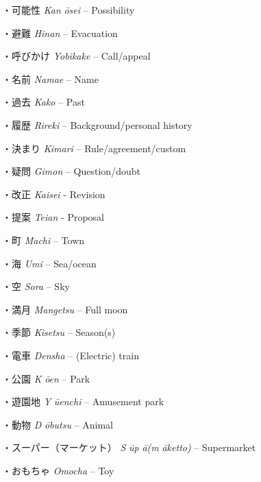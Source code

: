 \par{・可能性  \emph{Kan }\emph{ōsei }– Possibility }
 
\par{・避難  \emph{Hinan }– Evacuation }
 
\par{・呼びかけ  \emph{Yobikake }– Call\slash appeal }
 
\par{・名前  \emph{Namae }– Name }
 
\par{・過去  \emph{Kako }– Past }
 
\par{・履歴  \emph{Rireki }– Background\slash personal history }
 
\par{・決まり  \emph{Kimari }– Rule\slash agreement\slash custom }
 
\par{・疑問  \emph{Gimon }– Question\slash doubt }
 
\par{・改正  \emph{Kaisei }- Revision }
 
\par{・提案  \emph{Teian }- Proposal }
 
\par{・町  \emph{Machi }– Town }
 
\par{・海  \emph{Umi }– Sea\slash ocean }
 
\par{・空  \emph{Sora }– Sky }
 
\par{・満月  \emph{Mangetsu }– Full moon }
 
\par{・季節  \emph{Kisetsu }– Season(s) }
 
\par{・電車  \emph{Densha }– (Electric) train }
 
\par{・公園  \emph{K }\emph{ōen }– Park }
 
\par{・遊園地  \emph{Y }\emph{ūenchi }– Amusement park }
 
\par{・動物  \emph{D }\emph{ōbutsu }– Animal }
 
\par{・スーパー（マーケット）  \emph{S }\emph{ūp }\emph{ā(m }\emph{āketto) }– Supermarket }
 
\par{・おもちゃ  \emph{Omocha }– Toy }
 
